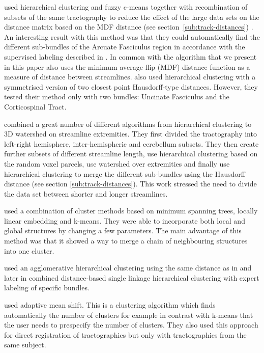 \documentclass{bioinfo}
\begin{document}
\citet{Visser2010} used hierarchical clustering and fuzzy c-means
together with recombination of subsets of the same tractography to
reduce the effect of the large data sets on the distance matrix based on
the MDF distance (see section~\ref{sub:track-distances})
\citep{EGMB10}. An interesting result with this method was that they
could automatically find the different sub-bundles of the Arcuate
Fasciculus region in accordance with the supervised labeling described
in \citet{catani2005perisylvian}. In common with \citet{Visser2010} the
algorithm that we present in this paper also uses the minimum average
flip (MDF) distance function as a measure of distance between
streamlines. \citet{gerig2004analysis} also used hierarchical clustering
with a symmetrised version of two closest point Hausdorff-type
distances.
However, they tested
their method only with two bundles: Uncinate Fasciculus and the
Corticospinal Tract.

\citet{Guevara2010} combined a great number of different algorithms from
hierarchical clustering to 3D watershed on streamline extremities.  They
first divided the tractography into left-right hemisphere,
inter-hemispheric and cerebellum subsets. They then create further
subsets of different streamline length, use hierarchical clustering
based on the random voxel parcels, use watershed over extremities and
finally use hierarchical clustering to merge the different sub-bundles
using the Hausdorff distance (see section
\ref{sub:track-distances}). This work stressed the need to divide the
data set between shorter and longer streamlines.

\citet{Tsai2007} used a combination of cluster methods based on minimum
spanning trees, locally linear embedding and k-means.  They were able to
incorporate both local and global structures by changing a few
parameters. The main advantage of this method was that it showed a way
to merge a chain of neighbouring structures into one cluster.

\citet*{zhang2005dti} used an agglomerative hierarchical clustering
using the same distance as in \citet{zhang2003visualizing} and later in
\citet{zhang2008identifying} combined distance-based single linkage
hierarchical clustering with expert labeling of specific
bundles. 

\citet{zvitia2008adaptive, Zvitia2010} used adaptive mean shift. This is
a clustering algorithm which finds automatically the number of clusters
for example in contrast with k-means that the user needs to prespecify
the number of clusters.  They also used this approach for direct
registration of tractographies but only with tractographies from the
same subject.
\end{document}
